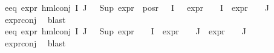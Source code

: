 \begin{isabellebody}
\ e{}{\isacharunderscore}{\kern0pt}eq{\isacharcolon}{\kern0pt}\ {\isachardoublequoteopen}expr{\isacharunderscore}{\kern0pt}{}\ {\isacharparenleft}{\kern0pt}hml{\isacharunderscore}{\kern0pt}conj\ I\ J\ {\isasymPhi}{\isacharparenright}{\kern0pt}\ {\isacharequal}{\kern0pt}\ Sup\ {\isacharparenleft}{\kern0pt}{\isacharparenleft}{\kern0pt}expr{\isacharunderscore}{\kern0pt}{}\ {\isacharbackquote}{\kern0pt}\ {\isacharparenleft}{\kern0pt}pos{\isacharunderscore}{\kern0pt}r\ {\isacharparenleft}{\kern0pt}{\isasymPhi}\ {\isacharbackquote}{\kern0pt}\ I{\isacharparenright}{\kern0pt}{\isacharparenright}{\kern0pt}{\isacharparenright}{\kern0pt}\ \ {\isasymunion}\ {\isacharparenleft}{\kern0pt}expr{\isacharunderscore}{\kern0pt}{}\ {\isasymcirc}\ {\isasymPhi}{\isacharparenright}{\kern0pt}\ {\isacharbackquote}{\kern0pt}\ I\ {\isasymunion}\ {\isacharparenleft}{\kern0pt}expr{\isacharunderscore}{\kern0pt}{}\ {\isasymcirc}\ {\isasymPhi}{\isacharparenright}{\kern0pt}\ {\isacharbackquote}{\kern0pt}\ J{\isacharparenright}{\kern0pt}{\isachardoublequoteclose}\isanewline
\ \ \ \ \isamarkupfalse%
\ expr{\isacharunderscore}{\kern0pt}{}{\isacharunderscore}{\kern0pt}conj\ \isamarkupfalse%
\ blast\isanewline
\ \ \isamarkupfalse%
\ e{}{\isacharunderscore}{\kern0pt}eq{\isacharcolon}{\kern0pt}\ {\isachardoublequoteopen}expr{\isacharunderscore}{\kern0pt}{}\ {\isacharparenleft}{\kern0pt}hml{\isacharunderscore}{\kern0pt}conj\ I\ J\ {\isasymPhi}{\isacharparenright}{\kern0pt}\ {\isacharequal}{\kern0pt}\ {\isacharparenleft}{\kern0pt}Sup\ {\isacharparenleft}{\kern0pt}{\isacharparenleft}{\kern0pt}expr{\isacharunderscore}{\kern0pt}{}\ {\isasymcirc}\ {\isasymPhi}{\isacharparenright}{\kern0pt}\ {\isacharbackquote}{\kern0pt}\ I\ {\isasymunion}\ {\isacharparenleft}{\kern0pt}expr{\isacharunderscore}{\kern0pt}{}\ {\isasymcirc}\ {\isasymPhi}{\isacharparenright}{\kern0pt}\ {\isacharbackquote}{\kern0pt}\ J\ {\isasymunion}\ {\isacharparenleft}{\kern0pt}expr{\isacharunderscore}{\kern0pt}{}\ {\isasymcirc}\ {\isasymPhi}{\isacharparenright}{\kern0pt}\ {\isacharbackquote}{\kern0pt}\ J{\isacharparenright}{\kern0pt}{\isacharparenright}{\kern0pt}{\isachardoublequoteclose}\isanewline
\ \ \ \ \isamarkupfalse%
\ expr{\isacharunderscore}{\kern0pt}{}{\isacharunderscore}{\kern0pt}conj\ \isamarkupfalse%
\ blast\isanewline
\ \ \isamarkupfalse%

\end{isabellebody}
